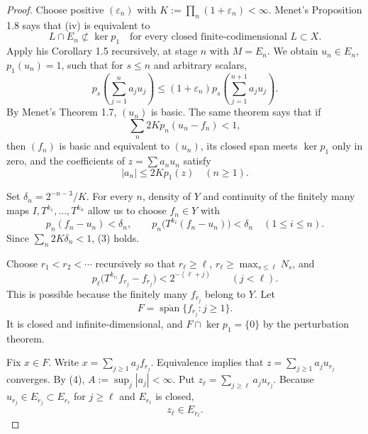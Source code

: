 \documentclass[10pt]{article}
\newcommand{\linspan}{\operatorname{span}}
\begin{document}
\begin{proof}
Choose positive $(\varepsilon_n)$ with $K:=\prod_n(1+\varepsilon_n)<\infty$.
Menet's Proposition 1.8 says that (iv) is equivalent to
\[
L\cap E_n\not\subset\ker p_1
\quad\text{for every closed finite-codimensional }L\subset X.
\tag{1}
\]
Apply his Corollary 1.5 recursively, at stage $n$ with $M=E_n$.  We obtain $u_n\in E_n$, $p_1(u_n)=1$, such that for $s\leq n$ and arbitrary scalars,
\begin{equation*}
p_s\!\left(\sum_{j=1}^{n}a_ju_j\right)
\leq(1+\varepsilon_n)
p_s\!\left(\sum_{j=1}^{n+1}a_ju_j\right).
\tag{2}
\end{equation*}
By Menet's Theorem 1.7, $(u_n)$ is basic.  The same theorem says that if
\begin{equation*}
\sum_n2Kp_n(u_n-f_n)<1,
\tag{3}
\end{equation*}
then $(f_n)$ is basic and equivalent to $(u_n)$, its closed span meets $\ker p_1$ only in zero, and the coefficients of $z=\sum a_nu_n$ satisfy
\begin{equation*}
|a_n|\leq 2Kp_1(z)\quad(n\geq1).
\tag{4}
\end{equation*}

Set $\delta_n=2^{-n-3}/K$.  For every $n$, density of $Y$ and continuity of the finitely many maps $I,T^{k_1},\ldots,T^{k_n}$ allow us to choose $f_n\in Y$ with
\begin{equation*}
p_n(f_n-u_n)<\delta_n,
\qquad
p_n\bigl(T^{k_i}(f_n-u_n)\bigr)<\delta_n\quad(1\leq i\leq n).
\tag{5}
\end{equation*}
Since $\sum_n2K\delta_n<1$, (3) holds.

Choose $r_1<r_2<\cdots$ recursively so that $r_\ell\geq\ell$,
$r_\ell\geq\max_{s\leq\ell}N_s$, and
\begin{equation*}
p_\ell\bigl(T^{k_{r_\ell}}f_{r_j}-f_{r_j}\bigr)
<2^{-(\ell+j)}\qquad(j<\ell).
\tag{6}
\end{equation*}
This is possible because the finitely many $f_{r_j}$ belong to $Y$.
Let
\[
F=\overline{\linspan}\{f_{r_j}:j\geq1\}.
\]
It is closed and infinite-dimensional, and $F\cap\ker p_1=\{0\}$ by the perturbation theorem.

Fix $x\in F$.  Write $x=\sum_{j\geq1}a_jf_{r_j}$.  Equivalence implies that
$z=\sum_{j\geq1}a_ju_{r_j}$ converges.  By (4), $A:=\sup_j|a_j|<\infty$.
Put $z_\ell=\sum_{j\geq\ell}a_ju_{r_j}$.  Because $u_{r_j}\in E_{r_j}\subset E_{r_\ell}$ for $j\geq\ell$ and $E_{r_\ell}$ is closed,
\[
z_\ell\in E_{r_\ell}.
\tag{7}
\]


\end{proof}
\end{document}
